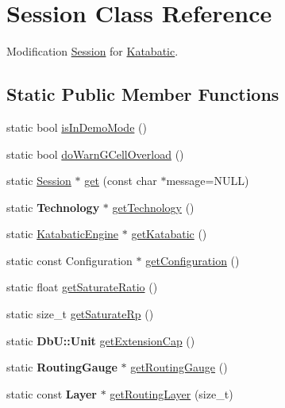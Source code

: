 \hypertarget{classKatabatic_1_1Session}{\section{Session Class Reference}
\label{classKatabatic_1_1Session}
}


Modification \hyperlink{classKatabatic_1_1Session}{Session} for \hyperlink{namespaceKatabatic}{Katabatic}.  


\subsection*{Static Public Member Functions}
\begin{DoxyCompactItemize}
\item 
static bool \hyperlink{classKatabatic_1_1Session_a037c7ec3b18ec43973f2e6fe3a172000}{is\-In\-Demo\-Mode} ()
\item 
static bool \hyperlink{classKatabatic_1_1Session_ad41e6fb02bd7bb01c27fb6aae36f0ddc}{do\-Warn\-G\-Cell\-Overload} ()
\item 
static \hyperlink{classKatabatic_1_1Session}{Session} $\ast$ \hyperlink{classKatabatic_1_1Session_a76f17c3642eaeba85fa0af5ae9d208b4}{get} (const char $\ast$message=N\-U\-L\-L)
\item 
static {\bf Technology} $\ast$ \hyperlink{classKatabatic_1_1Session_a109acfd064f3c1854abb8bb2c9b4ad30}{get\-Technology} ()
\item 
static \hyperlink{classKatabatic_1_1KatabaticEngine}{Katabatic\-Engine} $\ast$ \hyperlink{classKatabatic_1_1Session_a1ec4ff2ad2a5b964c0ff98170a366197}{get\-Katabatic} ()
\item 
static const Configuration $\ast$ \hyperlink{classKatabatic_1_1Session_a4d9fd503149d2fff66eb8ba3955b7a13}{get\-Configuration} ()
\item 
static float \hyperlink{classKatabatic_1_1Session_a266a4079ca235e8fdb622ef4996d324d}{get\-Saturate\-Ratio} ()
\item 
static size\-\_\-t \hyperlink{classKatabatic_1_1Session_adfdaa8b3e81de14fce1f99444b35fcda}{get\-Saturate\-Rp} ()
\item 
static {\bf Db\-U\-::\-Unit} \hyperlink{classKatabatic_1_1Session_a909ce95ac840ee708f9a49366f0c2690}{get\-Extension\-Cap} ()
\item 
static {\bf Routing\-Gauge} $\ast$ \hyperlink{classKatabatic_1_1Session_a9a05289b33122f312aa2c88c4b023292}{get\-Routing\-Gauge} ()
\item 
static const {\bf Layer} $\ast$ \hyperlink{classKatabatic_1_1Session_a3efd0f0d87be640dc566c1afd821e5e6}{get\-Routing\-Layer} (size\-\_\-t)

\end{DoxyCompactItemize}
